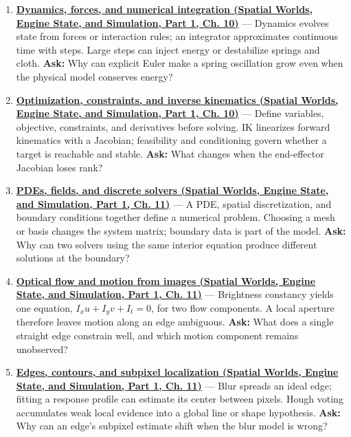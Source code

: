 \begin{enumerate}
\item
  \textbf{\href{../05-Spatial-Worlds-Engine-State-and-Simulation-P01/main.pdf\#04-visual-computing-ii-ch029-dynamics-forces-and-numerical-integration}{Dynamics, forces, and numerical integration (Spatial Worlds, Engine State, and Simulation, Part 1, Ch. 10)}} --- Dynamics evolves state from forces or interaction rules; an integrator approximates continuous time with steps. Large steps can inject energy or destabilize springs and cloth. \textbf{Ask:} Why can explicit Euler make a spring oscillation grow even when the physical model conserves energy?
\item
  \textbf{\href{../05-Spatial-Worlds-Engine-State-and-Simulation-P01/main.pdf\#04-visual-computing-ii-ch029-optimization-constraints-and-inverse-kinematics}{Optimization, constraints, and inverse kinematics (Spatial Worlds, Engine State, and Simulation, Part 1, Ch. 10)}} --- Define variables, objective, constraints, and derivatives before solving. IK linearizes forward kinematics with a Jacobian; feasibility and conditioning govern whether a target is reachable and stable. \textbf{Ask:} What changes when the end-effector Jacobian loses rank?
\item
  \textbf{\href{../05-Spatial-Worlds-Engine-State-and-Simulation-P01/main.pdf\#04-visual-computing-ii-ch030-pdes-fields-and-discrete-solvers}{PDEs, fields, and discrete solvers (Spatial Worlds, Engine State, and Simulation, Part 1, Ch. 11)}} --- A PDE, spatial discretization, and boundary conditions together define a numerical problem. Choosing a mesh or basis changes the system matrix; boundary data is part of the model. \textbf{Ask:} Why can two solvers using the same interior equation produce different solutions at the boundary?
\item
  \textbf{\href{../05-Spatial-Worlds-Engine-State-and-Simulation-P01/main.pdf\#04-visual-computing-ii-ch030-optical-flow-and-motion-from-images}{Optical flow and motion from images (Spatial Worlds, Engine State, and Simulation, Part 1, Ch. 11)}} --- Brightness constancy yields one equation, \(I_xu+I_yv+I_t=0\), for two flow components. A local aperture therefore leaves motion along an edge ambiguous. \textbf{Ask:} What does a single straight edge constrain well, and which motion component remains unobserved?
\item
  \textbf{\href{../05-Spatial-Worlds-Engine-State-and-Simulation-P01/main.pdf\#04-visual-computing-ii-ch030-edges-contours-and-subpixel-localization}{Edges, contours, and subpixel localization (Spatial Worlds, Engine State, and Simulation, Part 1, Ch. 11)}} --- Blur spreads an ideal edge; fitting a response profile can estimate its center between pixels. Hough voting accumulates weak local evidence into a global line or shape hypothesis. \textbf{Ask:} Why can an edge's subpixel estimate shift when the blur model is wrong?

\end{enumerate}
